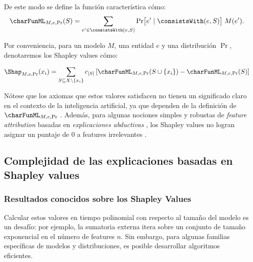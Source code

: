 
De este modo se define la función característica cómo:
\begin{align} \label{formula:characteristicFunctionDefinition}
    \charFunML_{M,e,\Pr}(S)
        = \sum_{e'\in\consistsWith(e,S)}
    \Pr\bigl[e'\mid\consistsWith(e,S)\bigr]\;M(e').    
\end{align}


Por conveniencia, para un modelo \(M\), una entidad \(e\) y una distribución \(\Pr\), denotaremos los Shapley values cómo:

\[
\Shap_{M,e,\Pr}(x_i) = \sum_{S \subseteq X \setminus \{x_i\}} c_{|S|} \left[ \charFunML_{M,e,\Pr}(S \cup \{x_i\}) - \charFunML_{M,e,\Pr}(S) \right]
\]



Nótese que los axiomas que estos valores satisfacen no tienen un significado claro en el contexto de la inteligencia artificial, ya que dependen de la definición de \(\charFunML_{M,e,\Pr}\) \cite{fryer2021shapley}. Además, para algunas nociones simples y robustas de \textit{feature attribution} basadas en \textit{explicaciones abductivas} \cite{marques2023logic}, los Shapley values no logran asignar un puntaje de 0 a features irrelevantes \cite{huang2023inadequacy}.

\subsection{Complejidad de las explicaciones basadas en Shapley values}

\subsubsection{Resultados conocidos sobre los Shapley Values}

Calcular estos valores en tiempo polinomial con respecto al tamaño del modelo es un desafío: por ejemplo, la sumatoria externa itera sobre un conjunto de tamaño exponencial en el número de features \(n\). Sin embargo, para algunas familias específicas de modelos y distribuciones, es posible desarrollar algoritmos eficientes.

